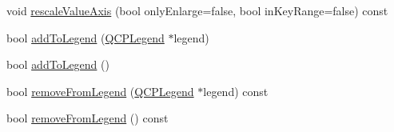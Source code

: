 \begin{DoxyCompactItemize}
\item 
void \hyperlink{class_q_c_p_abstract_plottable_a714eaf36b12434cd71846215504db82e}{rescale\+Value\+Axis} (bool only\+Enlarge=false, bool in\+Key\+Range=false) const
\item 
bool \hyperlink{class_q_c_p_abstract_plottable_aa64e93cb5b606d8110d2cc0a349bb30f}{add\+To\+Legend} (\hyperlink{class_q_c_p_legend}{Q\+C\+P\+Legend} $\ast$legend)
\item 
bool \hyperlink{class_q_c_p_abstract_plottable_a70f8cabfd808f7d5204b9f18c45c13f5}{add\+To\+Legend} ()
\item 
bool \hyperlink{class_q_c_p_abstract_plottable_a3cc235007e2343a65ad4f463767e0e20}{remove\+From\+Legend} (\hyperlink{class_q_c_p_legend}{Q\+C\+P\+Legend} $\ast$legend) const
\item 
bool \hyperlink{class_q_c_p_abstract_plottable_ac95fb2604d9106d0852ad9ceb326fe8c}{remove\+From\+Legend} () const
\end{DoxyCompactItemize}
